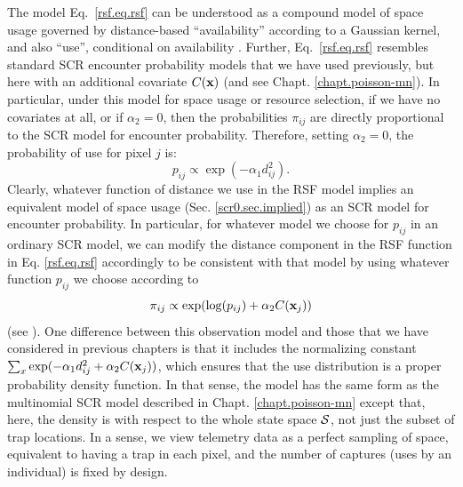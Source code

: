 The model Eq.~\ref{rsf.eq.rsf} can be understood as a compound model
of space usage governed by distance-based ``availability'' according
to a Gaussian kernel, and also ``use'', conditional on availability
\citep{johnson_etal:2008, forester_etal:2009}.  Further,
Eq.~\ref{rsf.eq.rsf} resembles standard SCR encounter probability
models that we have used previously, but here with an additional
covariate $C({\bf x})$ (and see Chapt. \ref{chapt.poisson-mn}).  In
particular, under this model for space usage or resource selection, if
we have no covariates at all, or if $\alpha_{2} = 0$, then the
probabilities $\pi_{ij}$ are directly proportional to the SCR model
for encounter probability.  Therefore, setting $\alpha_{2} = 0$, 
the probability of use for pixel $j$ is:
\[
p_{ij} \propto  \exp( -\alpha_{1} d_{ij}^{2}).
\]
Clearly, whatever function of distance we use in the RSF model implies
an equivalent model of space usage (Sec. \ref{scr0.sec.implied}) as an
SCR model for encounter probability.  In particular, for whatever
model we choose for $p_{ij}$ in an ordinary SCR model, we can modify
the distance component in the RSF function in Eq. \ref{rsf.eq.rsf}
accordingly to be consistent with that model by using whatever
function $p_{ij}$ we choose according to
\[
\pi_{ij} \propto \exp( \log(p_{ij}) + \alpha_{2} C({\bf x}_{j}) )
\]
(see \citet{forester_etal:2009}).
One difference between this observation model and those that we have
considered in previous chapters is that it includes the normalizing
constant $\sum_{x} \exp(-\alpha_{1} d_{ij}^{2} +\alpha_{2} C({\bf
  x}_{j}))$, which ensures that the use distribution is a proper
probability density function. In that sense, the model has the same
form as the multinomial SCR model described in
Chapt. \ref{chapt.poisson-mn} except that, here, the density is
with respect to the whole state space ${\cal S}$, not just the subset
of trap locations. In a sense, we view telemetry data as a perfect
sampling of space, equivalent to
having a trap in each pixel, and the number of captures (uses by an
individual) is fixed by design. 

